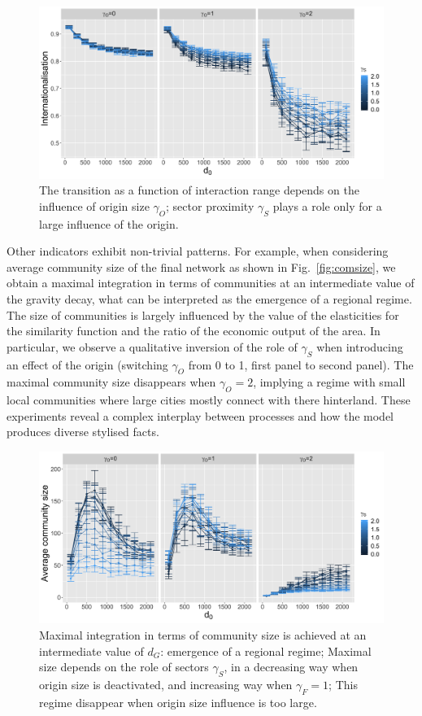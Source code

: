 \documentclass[10pt,letterpaper]{article}
\begin{document}
\begin{figure}
    \includegraphics[width=\linewidth]{figures/Fig5.png}
    \caption{The transition as a function of interaction range depends on the influence of origin size $\gamma_O$; sector proximity $\gamma_S$ plays a role only for a large influence of the origin.\label{fig:fig5}}
\end{figure}


Other indicators exhibit non-trivial patterns. For example, when considering average community size of the final network as shown in Fig.~\ref{fig:comsize}, we obtain a maximal integration in terms of communities at an intermediate value of the gravity decay, what can be interpreted as the emergence of a regional regime. The size of communities is largely influenced by the value of the elasticities for the similarity function and the ratio of the economic output of the area. In particular, we observe a qualitative inversion of the role of $\gamma_S$ when introducing an effect of the origin (switching $\gamma_O$ from 0 to 1, first panel to second panel). The maximal community size disappears when $\gamma_O = 2$, implying a regime with small local communities where large cities mostly connect with there hinterland. These experiments reveal a complex interplay between processes and how the model produces diverse stylised facts.

\begin{figure}
    \includegraphics[width=\textwidth]{figures/Fig6.png}
	\caption{Maximal integration in terms of community size is achieved at an intermediate value of $d_G$: emergence of a regional regime; Maximal size depends on the role of sectors $\gamma_S$, in a decreasing way when origin size is deactivated, and increasing way when $\gamma_F=1$; This regime disappear when origin size influence is too large.\label{fig:fig6}}
\end{figure}
\end{document}
